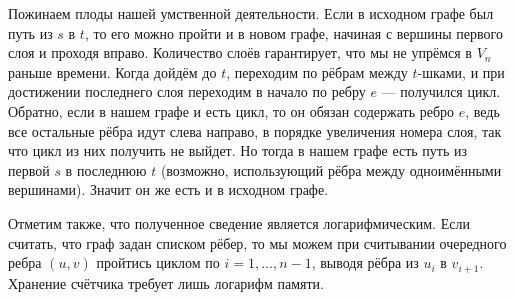 Пожинаем плоды нашей умственной деятельности. Если в исходном графе был путь из $s$ в $t$, то его можно пройти и в новом графе, начиная с вершины первого слоя и проходя вправо. Количество слоёв гарантирует, что мы не упрёмся в $V_n$ раньше времени. Когда дойдём до $t$, переходим по рёбрам между $t$-шками, и при достижении последнего слоя переходим в начало по ребру $e$ --- получился цикл. Обратно, если в нашем графе и есть цикл, то он обязан содержать ребро $e$, ведь все остальные рёбра идут слева направо, в порядке увеличения номера слоя, так что цикл из них получить не выйдет. Но тогда в нашем графе есть путь из первой $s$ в последнюю $t$ (возможно, использующий рёбра между одноимёнными вершинами). Значит он же есть и в исходном графе.

Отметим также, что полученное сведение является логарифмическим. Если считать, что граф задан списком рёбер, то мы можем при считывании очередного ребра $(u, v)$ пройтись циклом по $i=1, \ldots, n-1$, выводя рёбра из $u_i$ в $v_{i+1}$. Хранение счётчика требует лишь логарифм памяти.
